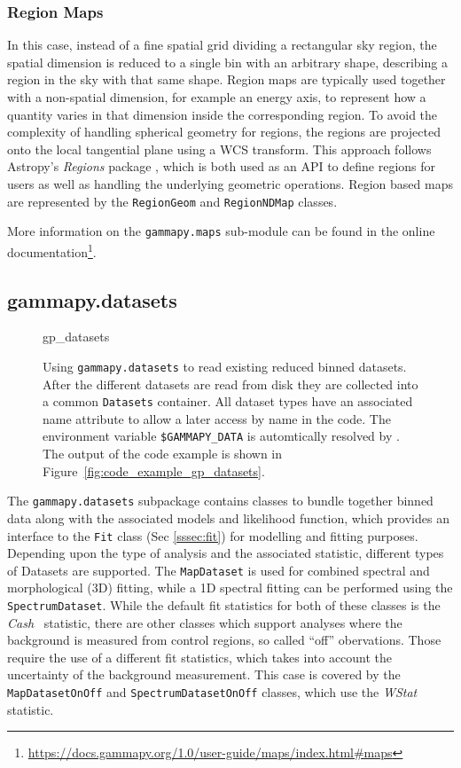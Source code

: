 \documentclass[longauth]{aa}
\newcommand{\code}[1]{\texttt{#1}}
\begin{document}
\subsubsection{Region Maps}
In this case, instead of a fine spatial grid
dividing a rectangular sky region, the spatial dimension is reduced to a single
bin with an arbitrary shape, describing a region in the sky with that same
shape. Region maps are typically used together with a non-spatial dimension, for
example an energy axis, to represent how a quantity varies in that dimension
inside the corresponding region. To avoid the complexity of handling
spherical geometry for regions, the regions are projected onto the local
tangential plane using a WCS transform. This approach follows Astropy's \textit{Regions}
package \citep{AstropyRegions2022}, which is both used as an API to define regions
for users as well as handling the underlying geometric operations. Region based
maps are represented by the \code{RegionGeom} and \code{RegionNDMap} classes.

More information on the \code{gammapy.maps} sub-module can be found 
in the online documentation\footnote{\url{https://docs.gammapy.org/1.0/user-guide/maps/index.html\#maps}}.

\subsection{gammapy.datasets}
\label{ssec:gammapy-datasets}
%
\begin{figure}
	\small
	{gp_datasets}
	\caption{
        Using \code{gammapy.datasets} to read existing reduced binned datasets.
        After the different datasets are read from disk they are collected into a
        common \code{Datasets} container. All dataset types have an associated
        name attribute to allow a later access by name in the code. The
        environment variable \code{\$GAMMAPY\_DATA} is automtically resolved
        by \gammapy. The output
		of the code example is shown in Figure~\ref{fig:code_example_gp_datasets}.
    }
	\label{fig*:minted:gp_datasets}
\end{figure}
%
The \code{gammapy.datasets} subpackage contains classes to bundle
together binned data along with the associated models and likelihood function, which
provides an interface to the \code{Fit} class (Sec \ref{sssec:fit}) for
modelling and fitting purposes. Depending upon the type of analysis and the
associated statistic, different types of Datasets are supported. The \code{MapDataset} is
used for combined spectral and morphological (3D) fitting, while a 1D spectral 
fitting can be performed using the \code{SpectrumDataset}.
While the default fit statistics for both of these classes is the \emph{Cash}~\citep{Cash}
statistic, there are other classes which support
analyses where the background is measured from control regions, so called \enquote{off} obervations.
Those require the use of a different fit statistics, which takes into account the
uncertainty of the background measurement. This case is covered by the \code{MapDatasetOnOff}
and \code{SpectrumDatasetOnOff} classes, which use the \emph{WStat}~\citep{WStat} statistic.
\end{document}
